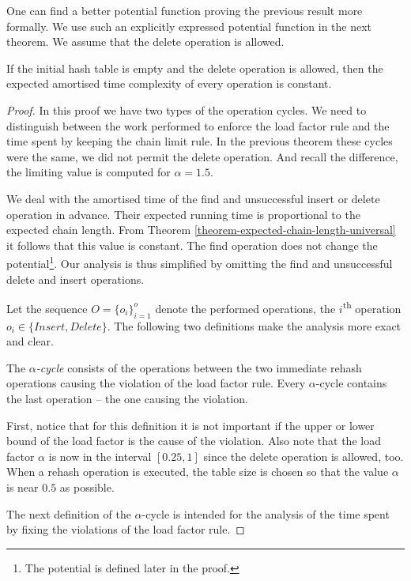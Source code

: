 One can find a better potential function proving the previous result more formally. We use such an explicitly expressed potential function in the next theorem. We assume that the delete operation is allowed.
\begin{theorem}
\label{theorem-delete-time}
If the initial hash table is empty and the delete operation is allowed, then the expected amortised time complexity of every operation is constant.
\end{theorem}
\begin{proof}
In this proof we have two types of the operation cycles. We need to distinguish between the work performed to enforce the load factor rule and the time spent by keeping the chain limit rule. In the previous theorem these cycles were the same, we did not permit the delete operation. And recall the difference, the limiting value is computed for $\alpha = 1.5$.

We deal with the amortised time of the find and unsuccessful insert or delete operation in advance. Their expected running time is proportional to the expected chain length. From Theorem \ref{theorem-expected-chain-length-universal} it follows that this value is constant. The find operation does not change the potential\footnote{The potential is defined later in the proof.}. Our analysis is thus simplified by omitting the find and unsuccessful delete and insert operations.

Let the sequence $O = \{o_i\}_{i=1}^o$ denote the performed operations, the $i$\textsuperscript{th} operation $o_i \in \lbrace Insert, Delete \rbrace$. The following two definitions make the analysis more exact and clear.

\begin{definition}
The \emph{$\alpha$-cycle} consists of the operations between the two immediate rehash operations causing the violation of the load factor rule. Every $\alpha$-cycle contains the last operation -- the one causing the violation.
\end{definition}
First, notice that for this definition it is not important if the upper or lower bound of the load factor is the cause of the violation. Also note that the load factor $\alpha$ is now in the interval $\left[0.25, 1\right]$ since the delete operation is allowed, too. When a rehash operation is executed, the table size is chosen so that the value $\alpha$ is near $0.5$ as possible. 

The next definition of the $\alpha$-cycle is intended for the analysis of the time spent by fixing the violations of the load factor rule.


\end{proof}
